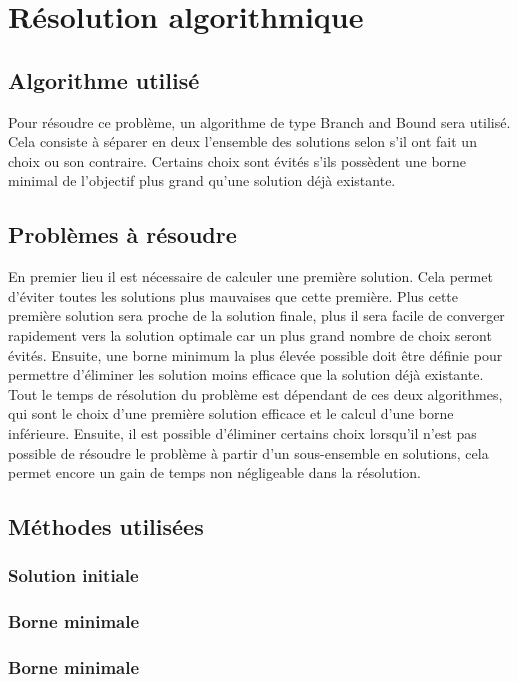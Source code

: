 \documentclass[a4paper, 12pt]{report}
\begin{document}
\chapter{Résolution algorithmique}
\section{Algorithme utilisé}

Pour résoudre ce problème, un algorithme de type Branch and Bound sera utilisé.
Cela consiste à séparer en deux l'ensemble des solutions selon s'il ont fait un choix ou son contraire.
Certains choix sont évités s'ils possèdent une borne minimal de l'objectif plus grand qu'une solution déjà existante. 

\section{Problèmes à résoudre}
En premier lieu il est nécessaire de calculer une première solution. 
Cela permet d'éviter toutes les solutions plus mauvaises que cette première.
Plus cette première solution sera proche de la solution finale, 
plus il sera facile de converger rapidement vers la solution optimale car un plus grand nombre de choix seront évités.
\newline{}
\newline{}
Ensuite, une borne minimum la plus élevée possible doit être définie 
pour permettre d'éliminer les solution moins efficace que la solution déjà existante. 
Tout le temps de résolution du problème est dépendant de ces deux algorithmes, 
qui sont le choix d'une première solution efficace et le calcul d'une borne inférieure. 
\newline{}
\newline{}
Ensuite, il est possible d'éliminer certains choix lorsqu'il n'est pas possible de résoudre le problème 
à partir d'un sous-ensemble en solutions, cela permet encore un gain de temps non négligeable dans la résolution.

\section{Méthodes utilisées}
\subsection{Solution initiale}


\subsection{Borne minimale}



\subsection{Borne minimale}
\end{document}
